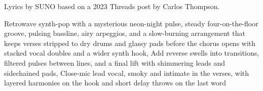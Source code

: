 
\begin{notes}
Lyrics by SUNO based on a 2023 Threads post by Carlos Thompson.
\end{notes}
\begin{style}
Retrowave synth-pop with a mysterious neon-night pulse, steady four-on-the-floor groove, pulsing bassline, airy arpeggios, and a slow-burning arrangement that keeps verses stripped to dry drums and glassy pads before the chorus opens with stacked vocal doubles and a wider synth hook, Add reverse swells into transitions, filtered pulses between lines, and a final lift with shimmering leads and sidechained pads, Close-mic lead vocal, smoky and intimate in the verses, with layered harmonies on the hook and short delay throws on the last word
\end{style}
